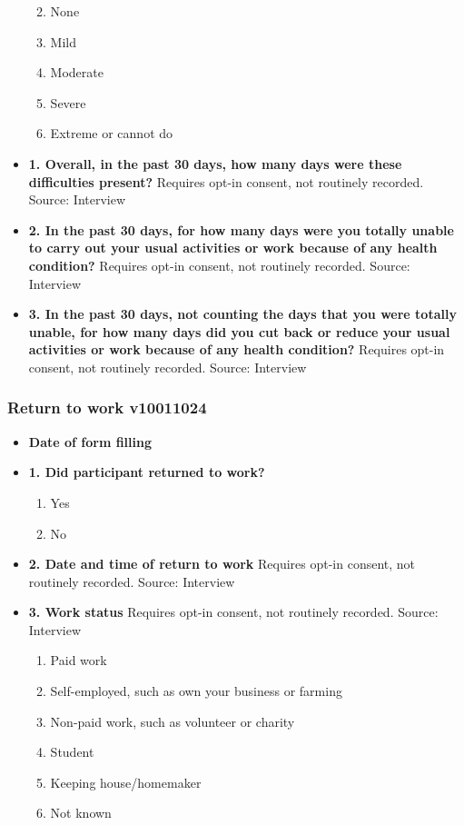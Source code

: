 \documentclass[
]{scrartcl}
\providecommand{\tightlist}{%
  \setlength{\itemsep}{0pt}\setlength{\parskip}{0pt}}\usepackage{longtable,booktabs,array}
\begin{document}
\begin{itemize}
  \begin{enumerate}
  \def\labelenumi{\arabic{enumi}.}
  \tightlist
  \item
    None
  \item
    Mild
  \item
    Moderate
  \item
    Severe
  \item
    Extreme or cannot do
  \end{enumerate}
\item
  \textbf{1. Overall, in the past 30 days, how many days were these
  difficulties present?} Requires opt-in consent, not routinely
  recorded. Source: Interview
\item
  \textbf{2. In the past 30 days, for how many days were you totally
  unable to carry out your usual activities or work because of any
  health condition?} Requires opt-in consent, not routinely recorded.
  Source: Interview
\item
  \textbf{3. In the past 30 days, not counting the days that you were
  totally unable, for how many days did you cut back or reduce your
  usual activities or work because of any health condition?} Requires
  opt-in consent, not routinely recorded. Source: Interview
\end{itemize}

\hypertarget{return-to-work-v10011024}{%
\subsubsection{Return to work
v10011024}\label{return-to-work-v10011024}}

\begin{itemize}
\item
  \textbf{Date of form filling}
\item
  \textbf{1. Did participant returned to work?}

  \begin{enumerate}
  \def\labelenumi{\arabic{enumi}.}
  \tightlist
  \item
    Yes
  \item
    No
  \end{enumerate}
\item
  \textbf{2. Date and time of return to work} Requires opt-in consent,
  not routinely recorded. Source: Interview
\item
  \textbf{3. Work status} Requires opt-in consent, not routinely
  recorded. Source: Interview

  \begin{enumerate}
  \def\labelenumi{\arabic{enumi}.}
  \tightlist
  \item
    Paid work
  \item
    Self-employed, such as own your business or farming
  \item
    Non-paid work, such as volunteer or charity
  \item
    Student
  \item
    Keeping house/homemaker
  \item
    Not known
  \end{enumerate}
\end{itemize}
\end{document}
